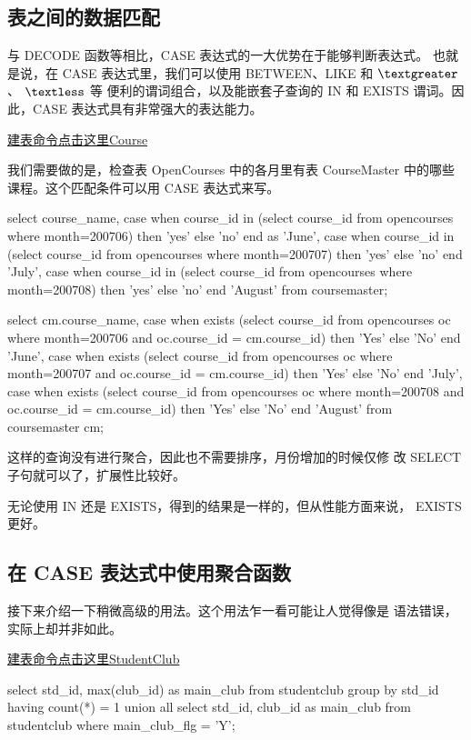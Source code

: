 \subsection{表之间的数据匹配}
与 DECODE 函数等相比，CASE 表达式的一大优势在于能够判断表达式。
也就是说，在 CASE 表达式里，我们可以使用 BETWEEN、LIKE 和 $\textgreater$、 $\textless$ 等
便利的谓词组合，以及能嵌套子查询的 IN 和 EXISTS 谓词。因此，CASE
表达式具有非常强大的表达能力。

\href{}{建表命令点击这里Course}

我们需要做的是，检查表 OpenCourses 中的各月里有表 CourseMaster
中的哪些课程。这个匹配条件可以用 CASE 表达式来写。

\begin{sqlc}
select course_name, 
	case when course_id in 
	(select course_id from opencourses where month=200706) 
    then 'yes' else 'no' end as 'June',
    case when course_id in 
	(select course_id from opencourses where month=200707) 
    then 'yes' else 'no' end 'July',
    case when course_id in 
	(select course_id from opencourses where month=200708) 
    then 'yes' else 'no' end 'August'
    from coursemaster;
\end{sqlc}

\begin{sqlc}
select cm.course_name,
	case when exists
		(select course_id from opencourses oc
         where month=200706 and oc.course_id = cm.course_id)
		then 'Yes' else 'No' end 'June',
	case when exists
		(select course_id from opencourses oc
         where month=200707 and oc.course_id = cm.course_id)
		then 'Yes' else 'No' end 'July',
	case when exists
		(select course_id from opencourses oc
         where month=200708 and oc.course_id = cm.course_id)
		then 'Yes' else 'No' end 'August'
	from coursemaster cm;
\end{sqlc}

这样的查询没有进行聚合，因此也不需要排序，月份增加的时候仅修
改 SELECT 子句就可以了，扩展性比较好。

无论使用 IN 还是 EXISTS，得到的结果是一样的，但从性能方面来说，
EXISTS 更好。

\subsection{在 CASE 表达式中使用聚合函数}
接下来介绍一下稍微高级的用法。这个用法乍一看可能让人觉得像是
语法错误，实际上却并非如此。

\href{}{建表命令点击这里StudentClub}

\begin{sqlc}
select std_id, max(club_id) as main_club
	from studentclub
    group by std_id
    having count(*) = 1
union all
select std_id, club_id as main_club
	from studentclub
    where main_club_flg = 'Y';
\end{sqlc}

